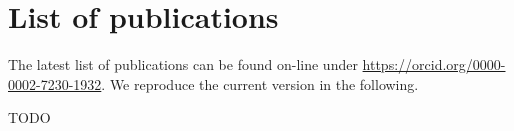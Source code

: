 \chapter{List of publications}
The latest list of publications can be found on-line under \url{https://orcid.org/0000-0002-7230-1932}. 
We reproduce the current version in the following.

TODO
